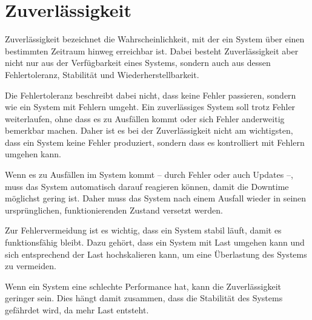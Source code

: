\section{Zuverlässigkeit}

Zuverlässigkeit bezeichnet die Wahrscheinlichkeit, mit der ein System über einen bestimmten Zeitraum hinweg erreichbar ist.
Dabei besteht Zuverlässigkeit aber nicht nur aus der Verfügbarkeit eines Systems, sondern auch aus dessen Fehlertoleranz, Stabilität und Wiederherstellbarkeit.

Die Fehlertoleranz beschreibt dabei nicht, dass keine Fehler passieren, sondern wie ein System mit Fehlern umgeht. Ein zuverlässiges System soll trotz Fehler weiterlaufen, ohne dass es zu Ausfällen kommt oder sich Fehler anderweitig bemerkbar machen.
Daher ist es bei der Zuverlässigkeit nicht am wichtigsten, dass ein System keine Fehler produziert, sondern dass es kontrolliert mit Fehlern umgehen kann.

Wenn es zu Ausfällen im System kommt – durch Fehler oder auch Updates –, muss das System automatisch darauf reagieren können, damit die Downtime möglichst gering ist.
Daher muss das System nach einem Ausfall wieder in seinen ursprünglichen, funktionierenden Zustand versetzt werden.

Zur Fehlervermeidung ist es wichtig, dass ein System stabil läuft, damit es funktionsfähig bleibt. 
Dazu gehört, dass ein System mit Last umgehen kann und sich entsprechend der Last hochskalieren kann, um eine Überlastung des Systems zu vermeiden.

Wenn ein System eine schlechte Performance hat, kann die Zuverlässigkeit geringer sein. Dies hängt damit zusammen, dass die Stabilität des Systems gefährdet wird, da mehr Last entsteht.
